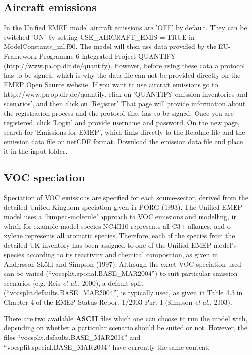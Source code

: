 \subsection{Aircraft emissions}
In the Unified EMEP model aircraft emissions are 'OFF' by default. 
They can be switched 'ON' by setting USE\_AIRCRAFT\_EMIS = TRUE in ModelConstants\_ml.f90. 
The model will then use data provided by the EU-Framework Programme 6 Integrated 
Project QUANTIFY (\url{http://www.pa.op.dlr.de/quantify}). However, before using 
these data a protocol has to be signed, which is why the data file can not be provided 
directly on the EMEP Open Source website. If you want to use aircraft emissions go to 
\url{http://www.pa.op.dlr.de/quantify}, click on 'QUANTIFY emission inventories and scenarios', 
and then click on 'Register'. That page will provide information about the registration 
process and the protocol that has to be signed. Once you are registered, click 'Login' and 
provide username and password. On the new page, search for 'Emissions for EMEP', which 
links directly to the Readme file and the emission data file on netCDF format. Download the 
emission data file and place it in the input folder.

\subsection{VOC speciation}
Speciation of VOC emissions are specified for each source-sector,
derived from the detailed United Kingdom speciation given in PORG
(1993). The Unified EMEP model uses a `lumped-molecule' approach to
VOC emissions and modelling, in which for example model species NC4H10
represents all C3+ alkanes, and o-xylene represents all aromatic
species. Therefore, each of the species from the detailed UK inventory
has been assigned to one of the Unified EMEP model's species according
to its reactivity and chemical composition, as given in
Andersson-Sk\"{o}ld and Simpson (1997). Although the exact VOC speciation
used can be varied (``vocsplit.special.BASE\_MAR2004'') to suit
particular emission scenarios (e.g. Reis {\sl et al.}, 2000), a default split
(``vocsplit.defaults.BASE\_MAR2004'') is typically used, as given in
Table 4.3 in Chapter 4 of the EMEP Status Report 1/2003 Part I (Simpson {\sl et al.}, 2003).

There are two available {\bf ASCII} files which one can choose to
run the model with, depending on whether a particular scenario should be
suited or not. However, the files
``vocsplit.defaults.BASE\_MAR2004'' and ``vocsplit.special.BASE\_MAR2004''
have currently the same content.

